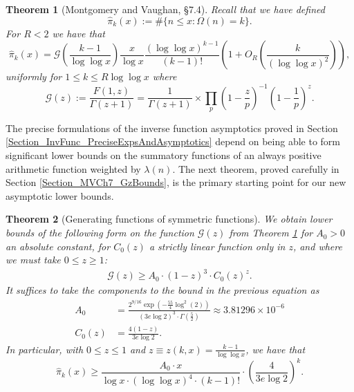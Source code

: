 \documentclass[11pt,reqno,a4letter]{article}
\numberwithin{figure}{section}
\numberwithin{table}{section}
\theoremstyle{plain}
\newtheorem{theorem}{Theorem}
\numberwithin{theorem}{section}
\theoremstyle{definition}
\begin{document}
\begin{theorem}[Montgomery and Vaughan, \S 7.4]
\label{theorem_HatPi_ExtInTermsOfGz} 
Recall that we have defined 
$$\widehat{\pi}_k(x) := \#\{n \leq x: \Omega(n)=k\}.$$ 
For $R < 2$ we have that 
\[
\widehat{\pi}_k(x) = \mathcal{G}\left(\frac{k-1}{\log\log x}\right) \frac{x}{\log x} 
     \frac{(\log\log x)^{k-1}}{(k-1)!} \left(1 + O_R\left(\frac{k}{(\log\log x)^2}\right)\right),  
\]
uniformly for $1 \leq k \leq R \log\log x$ where 
\[
\mathcal{G}(z) := \frac{F(1, z)}{\Gamma(z+1)} = \frac{1}{\Gamma(z+1)} \times 
     \prod_p \left(1-\frac{z}{p}\right)^{-1} \left(1-\frac{1}{p}\right)^z. 
\]
\end{theorem} 

The precise formulations of the inverse function asymptotics 
proved in Section \ref{Section_InvFunc_PreciseExpsAndAsymptotics} depend on being able to form 
significant lower bounds on the summatory functions of an always positive arithmetic function 
weighted by $\lambda(n)$. 
The next theorem, proved carefully in Section \ref{Section_MVCh7_GzBounds}, 
is the primary starting point for our new asymptotic lower bounds. 

\begin{theorem}[Generating functions of symmetric functions] 
\label{theorem_GFs_SymmFuncs_SumsOfRecipOfPowsOfPrimes} 
\label{cor_BoundsOnGz_FromMVBook_initial_stmt_v1} 
We obtain lower bounds of the following form on the function 
$\mathcal{G}(z)$ from Theorem \ref{theorem_HatPi_ExtInTermsOfGz} 
for $A_0 > 0$ an absolute constant, for 
$C_0(z)$ a strictly linear function only in $z$, and 
where we must take $0 \leq z \geq 1$: 
\begin{align*} 
\mathcal{G}(z) \geq A_0 \cdot (1-z)^{3} \cdot C_0(z)^{z}. 
\end{align*} 
It suffices to take the components to the bound in the previous equation as 
\begin{align*}
A_0 & = \frac{2^{9/16} \exp\left(-\frac{55}{4} \log^2(2)\right)}{ 
     (3e\log 2)^3 \cdot \Gamma\left(\frac{5}{2}\right)} \approx 3.81296 \times 10^{-6} \\ 
C_0(z) & = \frac{4(1-z)}{3e \log 2}. 
\end{align*} 
In particular, with $0 \leq z \leq 1$ and 
$z \equiv z(k, x) = \frac{k-1}{\log\log x}$, we have that 
\[
\widehat{\pi}_k(x) \geq \frac{A_0 \cdot x}{\log x \cdot (\log\log x)^4 \cdot (k-1)!} \cdot 
     \left(\frac{4}{3e\log 2}\right)^{k}.
\]
\end{theorem} 
\end{document}
